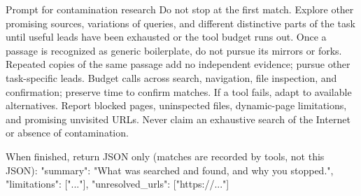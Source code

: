 \documentclass{article} %
\begin{document}
\begin{promptbox}{Prompt for contamination research}
Do not stop at the first match. Explore other promising sources, variations of
queries, and different distinctive parts of the task until useful leads have
been exhausted or the tool budget runs out. Once a passage is recognized as
generic boilerplate, do not pursue its mirrors or forks. Repeated copies of the
same passage add no independent evidence; pursue other task-specific leads.
Budget calls across search,
navigation, file inspection, and confirmation; preserve time to confirm matches.
If a tool fails, adapt to available alternatives. Report blocked pages,
uninspected files, dynamic-page limitations, and promising unvisited URLs.
Never claim an exhaustive search of the Internet or absence of contamination.

When finished, return JSON only (matches are recorded by tools, not this JSON):
{"summary": "What was searched and found, and why you stopped.",
 "limitations": ["..."], "unresolved_urls": ["https://..."]}
\end{promptbox}
\end{document}
